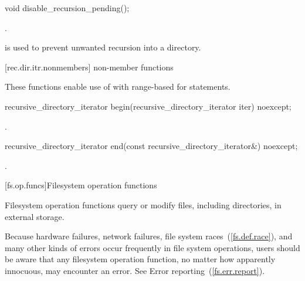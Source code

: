 %
\begin{itemdecl}
void disable_recursion_pending();
\end{itemdecl}

\begin{itemdescr}
\pnum
\postcondition {}.

\pnum
\begin{note} \tcode{()} is used to prevent
  unwanted recursion into a directory. \end{note}
\end{itemdescr}

[rec.dir.itr.nonmembers]{ non-member functions}

\pnum
These functions enable use of 
with range-based for statements.

%
\begin{itemdecl}
recursive_directory_iterator begin(recursive_directory_iterator iter) noexcept;
\end{itemdecl}

\begin{itemdescr}
\pnum
\returns {}.
\end{itemdescr}

%
\begin{itemdecl}
recursive_directory_iterator end(const recursive_directory_iterator&) noexcept;
\end{itemdecl}

\begin{itemdescr}
\pnum
\returns {}.
\end{itemdescr}

[fs.op.funcs]{Filesystem operation functions}

\pnum
Filesystem operation functions query or modify files, including directories,
in external storage.

\pnum
\begin{note} Because hardware failures, network failures, file system races~(\ref{fs.def.race}),
and many other kinds of errors occur frequently in file system operations, users should be aware
that any filesystem operation function, no matter how apparently innocuous, may encounter
an error. See Error reporting~(\ref{fs.err.report}). \end{note}

